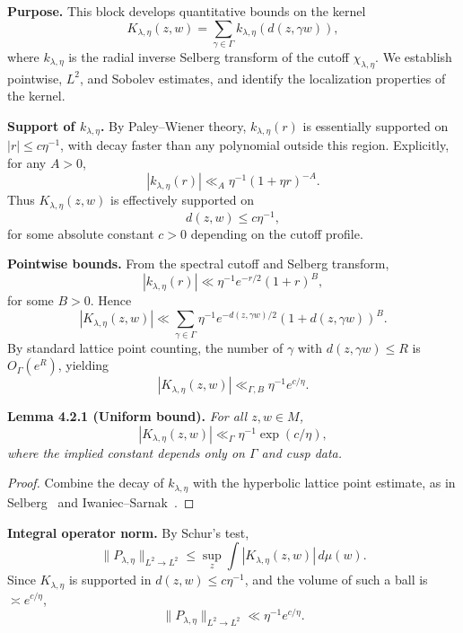 \noindent\textbf{Purpose.}
This block develops quantitative bounds on the kernel
\[
  K_{\lambda,\eta}(z,w) = \sum_{\gamma \in \Gamma} k_{\lambda,\eta}(d(z,\gamma w)),
\]
where $k_{\lambda,\eta}$ is the radial inverse Selberg transform of the cutoff $\chi_{\lambda,\eta}$.
We establish pointwise, $L^2$, and Sobolev estimates,
and identify the localization properties of the kernel.

\medskip

\noindent\textbf{Support of $k_{\lambda,\eta}$.}
By Paley–Wiener theory,
$k_{\lambda,\eta}(r)$ is essentially supported on $|r| \le c \eta^{-1}$,
with decay faster than any polynomial outside this region.
Explicitly, for any $A>0$,
\[
  |k_{\lambda,\eta}(r)| \ll_{A} \eta^{-1} (1+\eta r)^{-A}.
\]
Thus $K_{\lambda,\eta}(z,w)$ is effectively supported on
\[
  d(z,w) \le c\eta^{-1},
\]
for some absolute constant $c>0$ depending on the cutoff profile.

\medskip

\noindent\textbf{Pointwise bounds.}
From the spectral cutoff and Selberg transform,
\[
  |k_{\lambda,\eta}(r)| \ll \eta^{-1} e^{-r/2} (1+r)^{B},
\]
for some $B>0$.
Hence
\[
  |K_{\lambda,\eta}(z,w)| \ll \sum_{\gamma \in \Gamma} \eta^{-1} e^{-d(z,\gamma w)/2} (1+d(z,\gamma w))^{B}.
\]
By standard lattice point counting,
the number of $\gamma$ with $d(z,\gamma w)\le R$ is $O_\Gamma(e^{R})$,
yielding
\[
  |K_{\lambda,\eta}(z,w)| \ll_{\Gamma,B} \eta^{-1} e^{c/\eta}.
\]

\medskip

\noindent\textbf{Lemma 4.2.1 (Uniform bound).}
\emph{For all $z,w\in M$,}
\[
  |K_{\lambda,\eta}(z,w)| \ll_{\Gamma} \eta^{-1} \exp(c/\eta),
\]
\emph{where the implied constant depends only on $\Gamma$ and cusp data.}

\begin{proof}
Combine the decay of $k_{\lambda,\eta}$ with the hyperbolic lattice point estimate,
as in Selberg~\cite{Selberg1956} and Iwaniec–Sarnak~\cite{IwaniecSarnak1995}.
\end{proof}

\medskip

\noindent\textbf{Integral operator norm.}
By Schur’s test,
\[
  \|P_{\lambda,\eta}\|_{L^2\to L^2} \le \sup_{z}\int |K_{\lambda,\eta}(z,w)|\,d\mu(w).
\]
Since $K_{\lambda,\eta}$ is supported in $d(z,w)\le c\eta^{-1}$,
and the volume of such a ball is $\asymp e^{c/\eta}$,
\[
  \|P_{\lambda,\eta}\|_{L^2\to L^2} \ll \eta^{-1} e^{c/\eta}.
\]

\medskip

